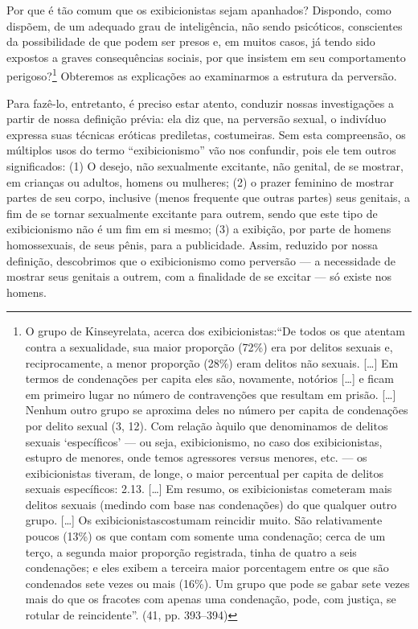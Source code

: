 Por que é tão comum que os exibicionistas sejam apanhados?
Dispondo, como dispõem, de um adequado grau de inteligência, não sendo
psicóticos, conscientes da possibilidade de que podem ser presos e, em
muitos casos, já tendo sido expostos a graves consequências sociais,
por que insistem em seu comportamento\idxexibiexpo{} perigoso?\footnote{ O grupo de
Kinsey\idxkins[|nn] relata, acerca dos exibicionistas:\idxexibicond[|nn] ``De todos os
que atentam contra a sexualidade, sua maior proporção (72\%) era por
delitos sexuais e, reciprocamente, a menor proporção (28\%) eram
delitos não sexuais. [\ldots{}] Em termos de condenações per capita eles
são, novamente, notórios [\ldots{}] e ficam em primeiro lugar no número de
contravenções que resultam em prisão. [\ldots{}] Nenhum outro grupo se
aproxima deles no número per capita de condenações por delito sexual
(3, 12). Com relação àquilo que denominamos de delitos sexuais
`específicos' --- ou seja, exibicionismo,
no caso dos exibicionistas, estupro de menores, onde temos agressores
versus menores, etc. --- os exibicionistas tiveram, de longe, o maior
percentual per capita de delitos sexuais específicos: 2.13. [\ldots{}] Em
resumo, os exibicionistas cometeram mais delitos sexuais (medindo com
base nas condenações) do que qualquer outro grupo. [\ldots{}] Os
exibicionistas\idxexibicond[|nn] costumam reincidir muito. São relativamente poucos 
(13\%) os que contam com somente uma condenação; cerca de um terço, a
segunda maior proporção registrada, tinha de quatro a seis condenações;
e eles exibem a terceira maior porcentagem entre os que são condenados
sete vezes ou mais (16\%). Um grupo que pode se gabar sete vezes mais
do que os fracotes com apenas uma condenação, pode, com justiça, se
rotular de reincidente''. (41, pp. 393--394)} Obteremos as explicações ao
examinarmos a estrutura da perversão.

Para fazê-lo, entretanto, é preciso estar atento, conduzir nossas
investigações a partir de nossa definição prévia: ela diz que, na
perversão sexual, o indivíduo expressa suas técnicas eróticas
prediletas, costumeiras. Sem esta compreensão, os múltiplos usos do
termo ``exibicionismo'' vão nos confundir,
pois ele tem outros significados: (1) O desejo, não sexualmente
excitante, não genital, de se mostrar, em crianças ou adultos, homens
ou mulheres; (2) o prazer feminino de mostrar partes de seu corpo,
inclusive (menos frequente que outras partes) seus genitais, a fim de
se tornar sexualmente excitante para outrem, sendo que este tipo de
exibicionismo não é um fim em si mesmo; (3) a exibição, por parte de
homens homossexuais,\idxhomosexib{} de seus pênis, para a publicidade. Assim, reduzido
por nossa definição, descobrimos que o exibicionismo como perversão
--- a necessidade de mostrar seus genitais a outrem, com a finalidade
de se excitar --- só existe nos homens.\idxpervpredo{}

